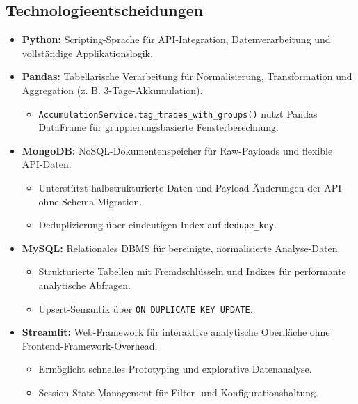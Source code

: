 \subsection{Technologieentscheidungen}
\begin{itemize}
  \item \textbf{Python:} Scripting-Sprache für API-Integration, Datenverarbeitung und vollständige Applikationslogik. %
  \item \textbf{Pandas:} Tabellarische Verarbeitung für Normalisierung, Transformation und Aggregation (z. B. 3-Tage-Akkumulation). %
    \begin{itemize}
      \item \texttt{AccumulationService.tag\_trades\_with\_groups()} nutzt Pandas DataFrame für gruppierungsbasierte Fensterberechnung. %
    \end{itemize}
  \item \textbf{MongoDB:} NoSQL-Dokumentenspeicher für Raw-Payloads und flexible API-Daten. %
    \begin{itemize}
      \item Unterstützt halbstrukturierte Daten und Payload-Änderungen der API ohne Schema-Migration.
      \item Deduplizierung über eindeutigen Index auf \texttt{dedupe\_key}. %
    \end{itemize}
  \item \textbf{MySQL:} Relationales DBMS für bereinigte, normalisierte Analyse-Daten. %
    \begin{itemize}
      \item Strukturierte Tabellen mit Fremdschlüsseln und Indizes für performante analytische Abfragen.
      \item Upsert-Semantik über \texttt{ON DUPLICATE KEY UPDATE}. %
    \end{itemize}
  \item \textbf{Streamlit:} Web-Framework für interaktive analytische Oberfläche ohne Frontend-Framework-Overhead. %
    \begin{itemize}
      \item Ermöglicht schnelles Prototyping und explorative Datenanalyse.
      \item Session-State-Management für Filter- und Konfigurationshaltung. %
    \end{itemize}
\end{itemize}

